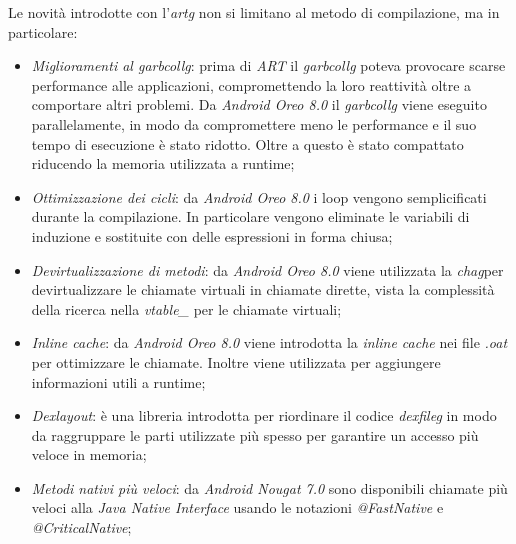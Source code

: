 Le novità introdotte con l'\emph{\gls{artg}} non si limitano al metodo di compilazione, ma in particolare:
\begin{itemize}
    \item \emph{Miglioramenti al \gls{garbcollg}\glsfirstoccur}: prima di \emph{ART} il \emph{\gls{garbcollg}} poteva provocare scarse performance alle applicazioni, compromettendo la loro reattività oltre a comportare altri problemi. Da \emph{Android Oreo 8.0} il \emph{\gls{garbcollg}} viene eseguito parallelamente, in modo da compromettere meno le performance e il suo tempo di esecuzione è stato ridotto. Oltre a questo è stato compattato riducendo la memoria utilizzata a runtime;
    
    \item \emph{Ottimizzazione dei cicli}: da \emph{Android Oreo 8.0} i loop vengono semplicificati durante la compilazione. In particolare vengono eliminate le variabili di induzione e sostituite con delle espressioni in forma chiusa;
    
    \item \emph{Devirtualizzazione di metodi}: da \emph{Android Oreo 8.0} viene utilizzata la \emph{\gls{chag}}\glsfirstoccurspace per devirtualizzare le chiamate virtuali in chiamate dirette, vista la complessità della ricerca nella \emph{vtable\_} per le chiamate virtuali;
    
    \item \emph{Inline cache}: da \emph{Android Oreo 8.0} viene introdotta la \emph{inline cache} nei file \emph{.oat} per ottimizzare le chiamate. Inoltre viene utilizzata per aggiungere informazioni utili a runtime;
    
    \item \emph{Dexlayout}: è una libreria introdotta per riordinare il codice \emph{\gls{dexfileg}} in modo da raggruppare le parti utilizzate più spesso per garantire un accesso più veloce in memoria;
    
    \item \emph{Metodi nativi più veloci}: da \emph{Android Nougat 7.0} sono disponibili chiamate più veloci alla \emph{Java Native Interface} usando le notazioni \emph{@FastNative} e \emph{@CriticalNative};
    

\end{itemize}
